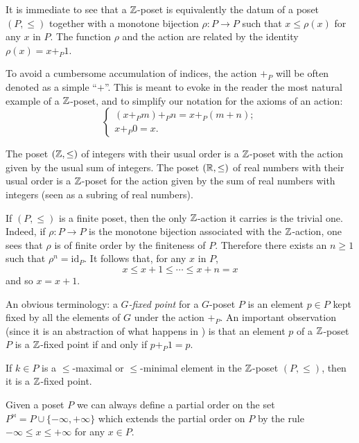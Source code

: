 \begin{remark}\label{trivial.but.useful}
It is immediate to see that a $\mathbb{Z}$-poset is equivalently the datum of a poset $(P,\leq)$ together with a monotone bijection $\rho\colon P\to P$ such that $x\leq \rho(x)$ for any $x$ in $P$. The function $\rho$ and the action are related by the identity $\rho(x)=x+_P1$.
\end{remark}
\begin{notat}
To avoid a cumbersome accumulation of indices, the action $+_P$ will be often denoted as a simple ``$+$''. This is meant to evoke in the reader the most natural example of a $\mathbb{Z}$-poset, and to simplify our notation for the axioms of an action:
\[
\begin{cases}
(x +_P m) +_P n = x +_P (m+n);\\
x +_P 0 = x.
\end{cases}
\]
\end{notat}
\begin{example}The poset $(\mathbb{Z} ,\leq)$ of integers with their usual order is a $\mathbb{Z}$-poset with the action given by the usual sum of integers. The poset $(\mathbb{R},\leq)$ of real numbers with their usual order is a $\mathbb{Z}$-poset for the action given by the sum of real numbers with integers (seen as a subring of real numbers).
\end{example}
\begin{remark}\label{rem.finite}
 If $(P,\leq)$ is a finite poset, then the only $\mathbb{Z}$-action it carries is the trivial one. Indeed, if $\rho\colon P\to P$ is the monotone bijection associated with the $\mathbb{Z}$-action, one sees that $\rho$ is of finite order by the finiteness of $P$. Therefore there exists an $n\geq 1$ such that $\rho^n=\mathrm{id}_P$. It follows that, for any $x$ in $P$,
 \[
 x\leq x+1\leq\cdots\leq x+n=x
 \]
and so $x=x+1$.
\end{remark}
\begin{notat}
An obvious terminology: a \emph{$G$-fixed point} for a $G$-poset $P$ is an element $p\in P$ kept fixed by all the elements of $G$ under the action $+_P$. An important observation (since it is an abstraction of what happens in \aprop{}) is that an element $p$ of a $\mathbb{Z}$-poset $P$ is a $\mathbb{Z}$-fixed point if and only if $p+_P 1 = p$.
\end{notat}
\begin{lemma}\label{minmax}
 If $k\in P$ is a $\le$-maximal or $\le$-minimal element in the $\mathbb{Z}$-poset $(P,\leq)$, then it is a $\mathbb{Z}$-fixed point.
\end{lemma}
\begin{remark}
Given a poset $P$ we can always define a partial order on the set $P^{\bowtie} = P\cup\{-\infty,+\infty\}$ which extends the partial order on $P$ by the rule $-\infty\leq x\leq +\infty$ for any $x\in P$. 
\end{remark}
